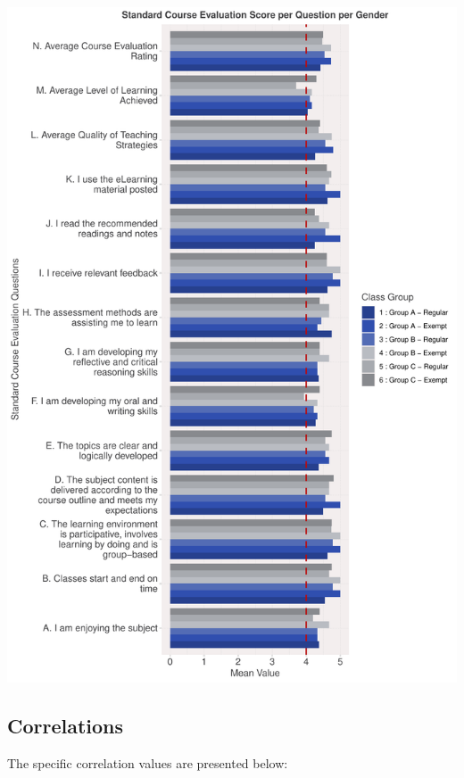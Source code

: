 \documentclass[
]{article}
\begin{document}
\includegraphics{AnalysisOfCourseEvaluation-Notebook_files/figure-latex/VisualizationsForCourseEvaluationResultsperGroup-1.pdf}

\newpage

\subsection{Correlations}\label{correlations}

The specific correlation values are presented below:
\end{document}
